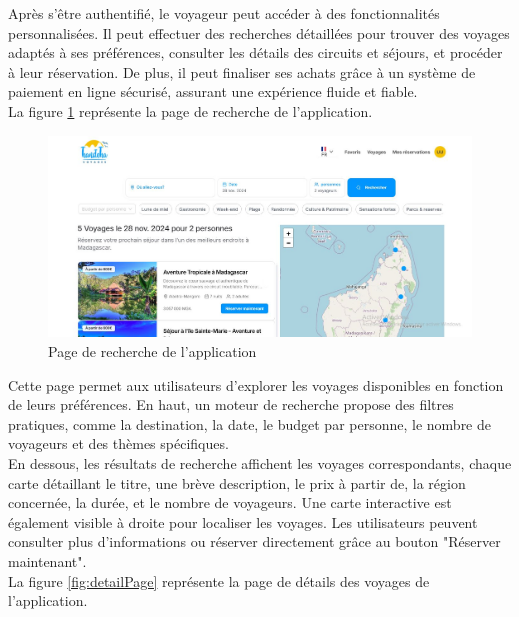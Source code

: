 \documentclass[12pt]{report}
\begin{document}
			Après s'être authentifié, le voyageur peut accéder à des fonctionnalités personnalisées. Il peut effectuer des recherches détaillées pour trouver des voyages adaptés à ses préférences, consulter les détails des circuits et séjours, et procéder à leur réservation. De plus, il peut finaliser ses achats grâce à un système de paiement en ligne sécurisé, assurant une expérience fluide et fiable.\\
			
			La figure \ref{fig:searchPage} représente la page de recherche de l'application.

			\begin{figure}[h]
				\centering
				\includegraphics[width=\textwidth]{searchPage.jpg}
				\caption{Page de recherche de l'application}
				\label{fig:searchPage}
			\end{figure}
			\FloatBarrier

			Cette page permet aux utilisateurs d'explorer les voyages disponibles en fonction de leurs préférences. En haut, un moteur de recherche propose des filtres pratiques, comme la destination, la date, le budget par personne, le nombre de voyageurs et des thèmes spécifiques.\\

			En dessous, les résultats de recherche affichent les voyages correspondants, chaque carte détaillant le titre, une brève description, le prix à partir de, la région concernée, la durée, et le nombre de voyageurs. Une carte interactive est également visible à droite pour localiser les voyages. Les utilisateurs peuvent consulter plus d'informations ou réserver directement grâce au bouton "Réserver maintenant".\\

			La figure \ref{fig:detailPage} représente la page de détails des voyages de l'application.
\end{document}
